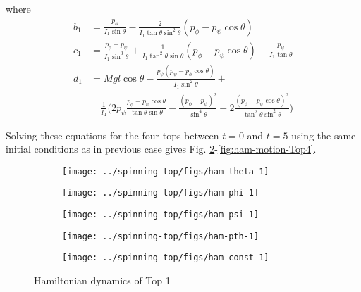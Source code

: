 where
\begin{subequations}
  \begin{align}
  b_1 &= \frac{p_\phi}{I_1 \sin \theta} - \frac{2}{I_1 \tan \theta \sin^2 \theta} \left( p_\phi - p_\psi \cos \theta \right) \\
  c_1 &= \frac{p_\phi - p_\psi}{I_1 \sin^3 \theta} + \frac{1}{I_1 \tan^2 \theta \sin \theta}\left(p_\phi -p_\psi \cos \theta \right) - \frac{p_\psi}{I_1 \tan \theta} \\
  d_1 &= Mgl\cos \theta -  \frac{p_\psi(p_\psi-p_\phi \cos \theta)}{I_1 \sin^2 \theta} + \\ &\quad \frac{1}{I_1}\bigg( 2p_\psi \frac{p_\phi - p_\psi \cos \theta}{\tan \theta \sin \theta} - \frac{(p_\phi - p_\psi)^2}{\sin^4 \theta} - 2\frac{(p_\phi - p_\psi \cos \theta)^2}{\tan^2 \theta \sin^2 \theta}\bigg)  \end{align}
\end{subequations}

Solving these equations for the four tops between $t=0$ and $t=5$ using the same initial conditions as in previous case gives Fig. \ref{fig:ham-motion-Top1}-\ref{fig:ham-motion-Top4}.


\begin{figure}[H]
  \centering
  \begin{subfigure}{0.49\textwidth}
    \texttt{[image: ../spinning-top/figs/ham-theta-1]}
    \caption{}
  \end{subfigure}
  \begin{subfigure}{0.49\textwidth}
    \texttt{[image: ../spinning-top/figs/ham-phi-1]}
    \caption{}
  \end{subfigure}
  \begin{subfigure}{0.49\textwidth}
    \texttt{[image: ../spinning-top/figs/ham-psi-1]}
    \caption{}
    \end{subfigure}
  \begin{subfigure}{0.49\textwidth}
    \texttt{[image: ../spinning-top/figs/ham-pth-1]}
    \caption{}
    \end{subfigure}
  \begin{subfigure}{0.49\textwidth}
    \texttt{[image: ../spinning-top/figs/ham-const-1]}
    \caption{}
    \label{fig:hamE1}
  \end{subfigure}
  \caption{Hamiltonian dynamics of Top 1}
  \label{fig:ham-motion-Top1}
\end{figure}


